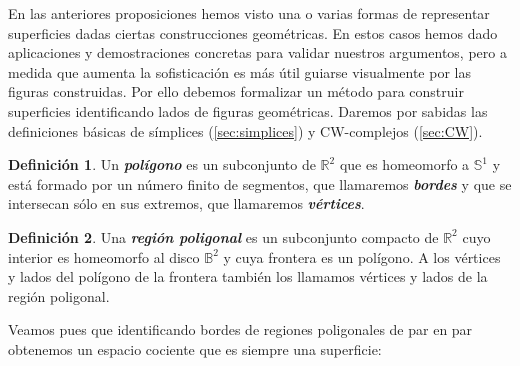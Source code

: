 \documentclass[10pt]{report}
\newcommand{\R}{\mathbb{R}}
\newcommand{\enfatiza}[1]{\textbf{\textit{#1}}}
\theoremstyle{definition}
\newtheorem{defin}{Definición}[section]
\begin{document}
En las anteriores proposiciones hemos visto una o varias formas de representar superficies dadas ciertas construcciones geométricas. En estos casos hemos dado aplicaciones y demostraciones concretas para validar nuestros argumentos, pero a medida que aumenta la sofisticación es más útil guiarse visualmente por las figuras construidas. Por ello debemos formalizar un método para construir superficies identificando lados de figuras geométricas.
Daremos por sabidas las definiciones básicas de símplices (\autoref{sec:simplices}) y CW-complejos (\autoref{sec:CW}).

\begin{defin}%
Un \enfatiza{polígono} es un subconjunto de $\R^2$ que es homeomorfo a $\mathbb{S}^1$ y está formado por un número finito de segmentos, que llamaremos \enfatiza{bordes} y que se intersecan sólo en sus extremos, que llamaremos \enfatiza{vértices}. %
\end{defin}

\begin{defin}%

Una \enfatiza{región poligonal} es un subconjunto compacto de $\R^2$ cuyo interior es homeomorfo al disco $\mathbb{B}^2$ y cuya frontera es un polígono.
A los vértices y lados del polígono de la frontera también los llamamos vértices y lados de la región poligonal.
\end{defin} 

Veamos pues que identificando bordes de regiones poligonales de par en par obtenemos un espacio cociente que es siempre una superficie:
\end{document}
